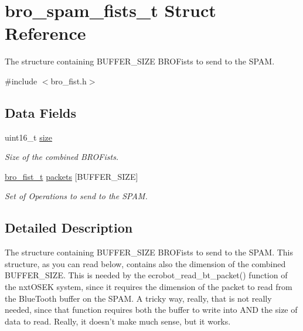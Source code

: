 \hypertarget{structbro__spam__fists__t}{
\section{bro\_\-spam\_\-fists\_\-t Struct Reference}
\label{structbro__spam__fists__t}
}


The structure containing BUFFER\_\-SIZE BROFists to send to the SPAM.  




{\ttfamily \#include $<$bro\_\-fist.h$>$}

\subsection*{Data Fields}
\begin{DoxyCompactItemize}
\item 
uint16\_\-t \hyperlink{structbro__spam__fists__t_aaba88b24a21a6c70c895c0d55f4a69a0}{size}
\begin{DoxyCompactList}\small\item\em Size of the combined BROFists. \item\end{DoxyCompactList}\item 
\hyperlink{structbro__fist__t}{bro\_\-fist\_\-t} \hyperlink{structbro__spam__fists__t_a5cccc799a79e4430d894573577992c2d}{packets} \mbox{[}BUFFER\_\-SIZE\mbox{]}
\begin{DoxyCompactList}\small\item\em Set of Operations to send to the SPAM. \item\end{DoxyCompactList}\end{DoxyCompactItemize}


\subsection{Detailed Description}
The structure containing BUFFER\_\-SIZE BROFists to send to the SPAM. This structure, as you can read below, contains also the dimension of the combined BUFFER\_\-SIZE. This is needed by the ecrobot\_\-read\_\-bt\_\-packet() function of the nxtOSEK system, since it requires the dimension of the packet to read from the BlueTooth buffer on the SPAM. A tricky way, really, that is not really needed, since that function requires both the buffer to write into AND the size of data to read. Really, it doesn't make much sense, but it works. 

